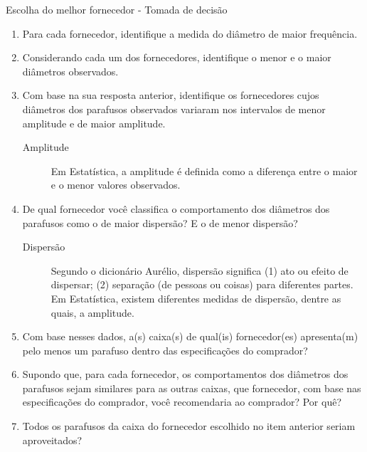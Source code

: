 \begin{task}{Escolha do melhor fornecedor - Tomada de decisão}
\begin{enumerate}
\item {} 
Para cada fornecedor, identifique a medida do diâmetro de maior frequência.

\item {} 
Considerando cada um dos fornecedores, identifique o menor e o maior diâmetros observados.

\item {} 
Com base na sua resposta anterior, identifique os fornecedores cujos diâmetros dos parafusos observados variaram nos intervalos de menor amplitude e de maior amplitude.


\begin{description}
\item[{Amplitude}] \leavevmode{}\label{\detokenize{PE103-0:term-amplitude}}
Em Estatística, a amplitude é definida como a diferença entre o maior e o menor valores observados.

\end{description}

\item De qual fornecedor você classifica o comportamento dos diâmetros dos parafusos como o de maior    dispersão? E o de menor dispersão?
\begin{description}
\item[{Dispersão}] \leavevmode{}\label{\detokenize{PE103-0:term-dispersao}}
Segundo o dicionário Aurélio, dispersão significa (1) ato ou efeito de dispersar; (2) separação (de pessoas ou coisas) para diferentes partes.  Em Estatística, existem diferentes medidas de dispersão, dentre as quais, a amplitude.

\end{description}

\item Com base nesses dados, a(s) caixa(s) de qual(is)  fornecedor(es) apresenta(m) pelo menos um parafuso dentro das especificações do comprador?

\item Supondo que, para cada fornecedor, os comportamentos dos diâmetros dos parafusos sejam similares para as outras caixas, que fornecedor, com base nas especificações do comprador, você recomendaria ao comprador? Por quê?

\item Todos os parafusos da caixa do fornecedor escolhido no item anterior seriam aproveitados?
\end{enumerate}

\end{task}


